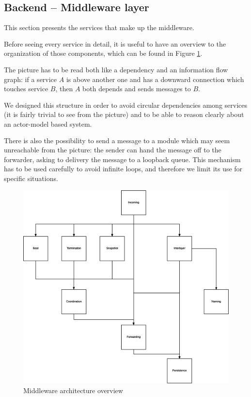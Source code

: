 \subsection{Backend -- Middleware layer}
This section presents the services that make up the middleware.

Before seeing every service in detail, it is useful to have an overview to the
organization of those components, which can be found in Figure
\ref{fig:mw-arch-over}.

The picture has to be read both like a dependency and an information flow
graph: if a service $A$ is above another one and has a downward connection
which touches service $B$, then $A$ both depends and sends messages to $B$.

We designed this structure in order to avoid circular dependencies among
services (it is fairly trivial to see from the picture) and to be able to
reason clearly about an actor-model based system.

There is also the possibility to send a message to a module which may seem
unreachable from the picture: the sender can hand the message off to the
forwarder, asking to delivery the message to a loopback queue.
This mechanism has to be used carefully to avoid infinite loops, and therefore
we limit its use for specific situations.

\begin{figure}[H]
  \centering
  \includegraphics[width=\columnwidth]{images/solution/mw/overview.eps}
  \caption{Middleware architecture overview}
  \label{fig:mw-arch-over}
\end{figure}

